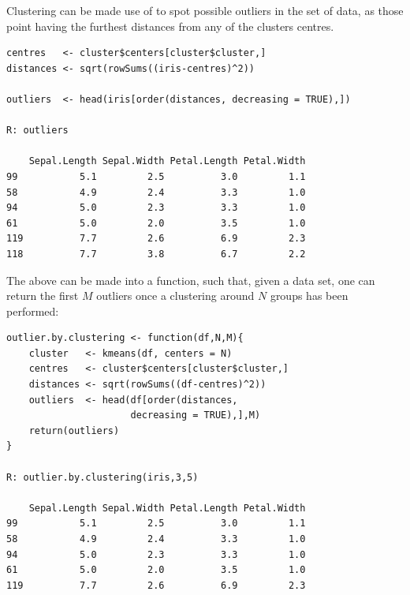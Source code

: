 Clustering can be made use of to spot 
possible outliers in the set of data, 
as those point having the furthest distances
from any of the clusters centres.
\begin{verbatim}
centres   <- cluster$centers[cluster$cluster,]
distances <- sqrt(rowSums((iris-centres)^2))

outliers  <- head(iris[order(distances, decreasing = TRUE),])

R: outliers

    Sepal.Length Sepal.Width Petal.Length Petal.Width
99           5.1         2.5          3.0         1.1
58           4.9         2.4          3.3         1.0
94           5.0         2.3          3.3         1.0
61           5.0         2.0          3.5         1.0
119          7.7         2.6          6.9         2.3
118          7.7         3.8          6.7         2.2
\end{verbatim}
The above can be made into a function, such that, given 
a data set, one can return the first $M$ outliers once 
a clustering around $N$ groups has been performed:
\begin{verbatim}
outlier.by.clustering <- function(df,N,M){
    cluster   <- kmeans(df, centers = N)
    centres   <- cluster$centers[cluster$cluster,]
    distances <- sqrt(rowSums((df-centres)^2))
    outliers  <- head(df[order(distances, 
                      decreasing = TRUE),],M)
    return(outliers)
}

R: outlier.by.clustering(iris,3,5)

    Sepal.Length Sepal.Width Petal.Length Petal.Width
99           5.1         2.5          3.0         1.1
58           4.9         2.4          3.3         1.0
94           5.0         2.3          3.3         1.0
61           5.0         2.0          3.5         1.0
119          7.7         2.6          6.9         2.3
\end{verbatim}



